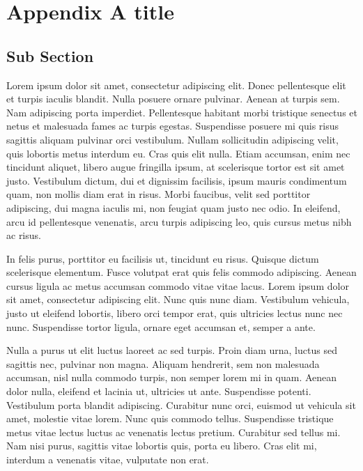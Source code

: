 \chapter{Appendix A title}\label{chap:AppA}
\clearemptydoublepage

\section*{Sub Section}

%


%

Lorem ipsum dolor sit amet, consectetur adipiscing elit. Donec pellentesque elit et turpis iaculis blandit. Nulla posuere ornare pulvinar. Aenean at turpis sem. Nam adipiscing porta imperdiet. Pellentesque habitant morbi tristique senectus et netus et malesuada fames ac turpis egestas. Suspendisse posuere mi quis risus sagittis aliquam pulvinar orci vestibulum. Nullam sollicitudin adipiscing velit, quis lobortis metus interdum eu. Cras quis elit nulla. Etiam accumsan, enim nec tincidunt aliquet, libero augue fringilla ipsum, at scelerisque tortor est sit amet justo. Vestibulum dictum, dui et dignissim facilisis, ipsum mauris condimentum quam, non mollis diam erat in risus. Morbi faucibus, velit sed porttitor adipiscing, dui magna iaculis mi, non feugiat quam justo nec odio. In eleifend, arcu id pellentesque venenatis, arcu turpis adipiscing leo, quis cursus metus nibh ac risus.

In felis purus, porttitor eu facilisis ut, tincidunt eu risus. Quisque dictum scelerisque elementum. Fusce volutpat erat quis felis commodo adipiscing. Aenean cursus ligula ac metus accumsan commodo vitae vitae lacus. Lorem ipsum dolor sit amet, consectetur adipiscing elit. Nunc quis nunc diam. Vestibulum vehicula, justo ut eleifend lobortis, libero orci tempor erat, quis ultricies lectus nunc nec nunc. Suspendisse tortor ligula, ornare eget accumsan et, semper a ante.

Nulla a purus ut elit luctus laoreet ac sed turpis. Proin diam urna, luctus sed sagittis nec, pulvinar non magna. Aliquam hendrerit, sem non malesuada accumsan, nisl nulla commodo turpis, non semper lorem mi in quam. Aenean dolor nulla, eleifend et lacinia ut, ultricies ut ante. Suspendisse potenti. Vestibulum porta blandit adipiscing. Curabitur nunc orci, euismod ut vehicula sit amet, molestie vitae lorem. Nunc quis commodo tellus. Suspendisse tristique metus vitae lectus luctus ac venenatis lectus pretium. Curabitur sed tellus mi. Nam nisi purus, sagittis vitae lobortis quis, porta eu libero. Cras elit mi, interdum a venenatis vitae, vulputate non erat.

